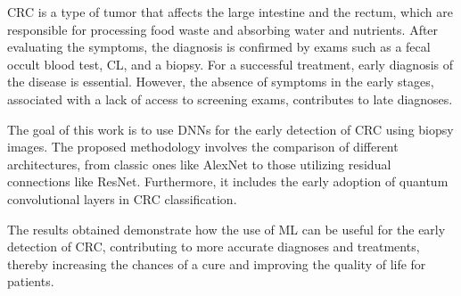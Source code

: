 \gls{CRC} is a type of tumor that affects the large intestine and the rectum, which are responsible for processing food waste and absorbing water and nutrients. After evaluating the symptoms, the diagnosis is confirmed by exams such as a fecal occult blood test, \gls{CL}, and a biopsy. For a successful treatment, early diagnosis of the disease is essential. However, the absence of symptoms in the early stages, associated with a lack of access to screening exams, contributes to late diagnoses.

The goal of this work is to use \glspl{DNN} for the early detection of \gls{CRC} using biopsy images. The proposed methodology involves the comparison of different architectures, from classic ones like AlexNet to those utilizing residual connections like ResNet. Furthermore, it includes the early adoption of quantum convolutional layers in \gls{CRC} classification.

The results obtained demonstrate how the use of \gls{ML} can be useful for the early detection of \gls{CRC}, contributing to more accurate diagnoses and treatments, thereby increasing the chances of a cure and improving the quality of life for patients.

